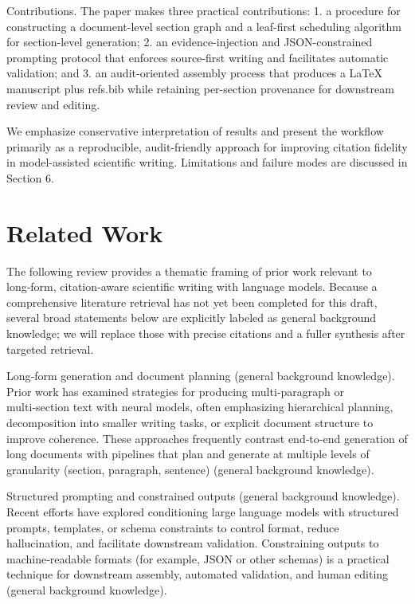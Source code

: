 \documentclass{article}%
\begin{document}
Contributions. The paper makes three practical contributions: 1. a procedure for constructing a document-level section graph and a leaf-first scheduling algorithm for section-level generation; 2. an evidence-injection and JSON-constrained prompting protocol that enforces source-first writing and facilitates automatic validation; and 3. an audit-oriented assembly process that produces a LaTeX manuscript plus refs.bib while retaining per-section provenance for downstream review and editing.

We emphasize conservative interpretation of results and present the workflow primarily as a reproducible, audit-friendly approach for improving citation fidelity in model-assisted scientific writing. Limitations and failure modes are discussed in Section 6.%

%
\section{Related Work}%


%
The following review provides a thematic framing of prior work relevant to long‑form, citation‑aware scientific writing with language models. Because a comprehensive literature retrieval has not yet been completed for this draft, several broad statements below are explicitly labeled as general background knowledge; we will replace those with precise citations and a fuller synthesis after targeted retrieval.

Long‑form generation and document planning (general background knowledge). Prior work has examined strategies for producing multi‑paragraph or multi‑section text with neural models, often emphasizing hierarchical planning, decomposition into smaller writing tasks, or explicit document structure to improve coherence. These approaches frequently contrast end‑to‑end generation of long documents with pipelines that plan and generate at multiple levels of granularity (section, paragraph, sentence) (general background knowledge).

Structured prompting and constrained outputs (general background knowledge). Recent efforts have explored conditioning large language models with structured prompts, templates, or schema constraints to control format, reduce hallucination, and facilitate downstream validation. Constraining outputs to machine‑readable formats (for example, JSON or other schemas) is a practical technique for downstream assembly, automated validation, and human editing (general background knowledge).
\end{document}
